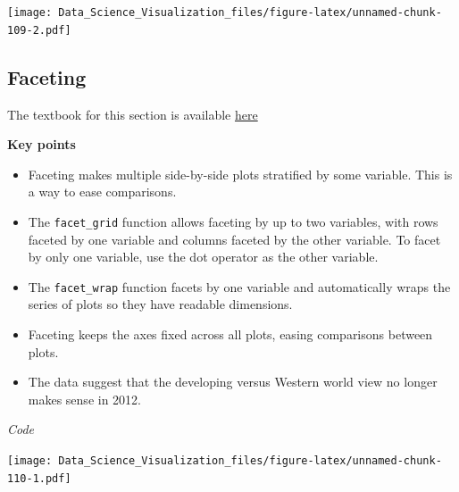 \documentclass[
]{article}
\newenvironment{Shaded}{\begin{snugshade}}{\end{snugshade}}
\newcommand{\CommentTok}[1]{\textcolor[rgb]{0.56,0.35,0.01}{\textit{#1}}}
\newcommand{\DataTypeTok}[1]{\textcolor[rgb]{0.13,0.29,0.53}{#1}}
\newcommand{\DecValTok}[1]{\textcolor[rgb]{0.00,0.00,0.81}{#1}}
\newcommand{\KeywordTok}[1]{\textcolor[rgb]{0.13,0.29,0.53}{\textbf{#1}}}
\newcommand{\NormalTok}[1]{#1}
\newcommand{\OperatorTok}[1]{\textcolor[rgb]{0.81,0.36,0.00}{\textbf{#1}}}
\newcommand{\StringTok}[1]{\textcolor[rgb]{0.31,0.60,0.02}{#1}}
\providecommand{\tightlist}{%
  \setlength{\itemsep}{0pt}\setlength{\parskip}{0pt}}
\begin{document}
\texttt{[image: Data\_Science\_Visualization\_files/figure-latex/unnamed-chunk-109-2.pdf]}

\hypertarget{faceting}{%
\subsection{Faceting}\label{faceting}}

The textbook for this section is available
\href{https://rafalab.github.io/dsbook/gapminder.html\#faceting}{here}

\textbf{Key points}

\begin{itemize}
\tightlist
\item
  Faceting makes multiple side-by-side plots stratified by some
  variable. This is a way to ease comparisons.
\item
  The \texttt{facet\_grid} function allows faceting by up to two
  variables, with rows faceted by one variable and columns faceted by
  the other variable. To facet by only one variable, use the dot
  operator as the other variable.
\item
  The \texttt{facet\_wrap} function facets by one variable and
  automatically wraps the series of plots so they have readable
  dimensions.
\item
  Faceting keeps the axes fixed across all plots, easing comparisons
  between plots.
\item
  The data suggest that the developing versus Western world view no
  longer makes sense in 2012.
\end{itemize}

\emph{Code}

\begin{Shaded}
\end{Shaded}

\texttt{[image: Data\_Science\_Visualization\_files/figure-latex/unnamed-chunk-110-1.pdf]}
\end{document}

